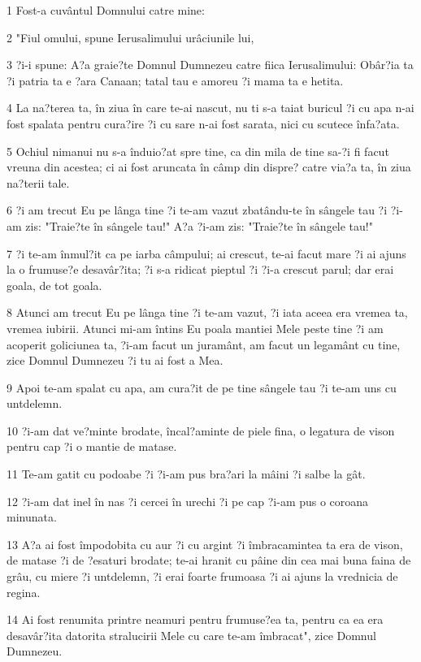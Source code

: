 \par 1 Fost-a cuvântul Domnului catre mine:
\par 2 "Fiul omului, spune Ierusalimului urâciunile lui,
\par 3 ?i-i spune: A?a graie?te Domnul Dumnezeu catre fiica Ierusalimului: Obâr?ia ta ?i patria ta e ?ara Canaan; tatal tau e amoreu ?i mama ta e hetita.
\par 4 La na?terea ta, în ziua în care te-ai nascut, nu ti s-a taiat buricul ?i cu apa n-ai fost spalata pentru cura?ire ?i cu sare n-ai fost sarata, nici cu scutece înfa?ata.
\par 5 Ochiul nimanui nu s-a înduio?at spre tine, ca din mila de tine sa-?i fi facut vreuna din acestea; ci ai fost aruncata în câmp din dispre? catre via?a ta, în ziua na?terii tale.
\par 6 ?i am trecut Eu pe lânga tine ?i te-am vazut zbatându-te în sângele tau ?i ?i-am zis: "Traie?te în sângele tau!" A?a ?i-am zis: "Traie?te în sângele tau!"
\par 7 ?i te-am înmul?it ca pe iarba câmpului; ai crescut, te-ai facut mare ?i ai ajuns la o frumuse?e desavâr?ita; ?i s-a ridicat pieptul ?i ?i-a crescut parul; dar erai goala, de tot goala.
\par 8 Atunci am trecut Eu pe lânga tine ?i te-am vazut, ?i iata aceea era vremea ta, vremea iubirii. Atunci mi-am întins Eu poala mantiei Mele peste tine ?i am acoperit goliciunea ta, ?i-am facut un juramânt, am facut un legamânt cu tine, zice Domnul Dumnezeu ?i tu ai fost a Mea.
\par 9 Apoi te-am spalat cu apa, am cura?it de pe tine sângele tau ?i te-am uns cu untdelemn.
\par 10 ?i-am dat ve?minte brodate, încal?aminte de piele fina, o legatura de vison pentru cap ?i o mantie de matase.
\par 11 Te-am gatit cu podoabe ?i ?i-am pus bra?ari la mâini ?i salbe la gât.
\par 12 ?i-am dat inel în nas ?i cercei în urechi ?i pe cap ?i-am pus o coroana minunata.
\par 13 A?a ai fost împodobita cu aur ?i cu argint ?i îmbracamintea ta era de vison, de matase ?i de ?esaturi brodate; te-ai hranit cu pâine din cea mai buna faina de grâu, cu miere ?i untdelemn, ?i erai foarte frumoasa ?i ai ajuns la vrednicia de regina.
\par 14 Ai fost renumita printre neamuri pentru frumuse?ea ta, pentru ca ea era desavâr?ita datorita stralucirii Mele cu care te-am îmbracat", zice Domnul Dumnezeu.
